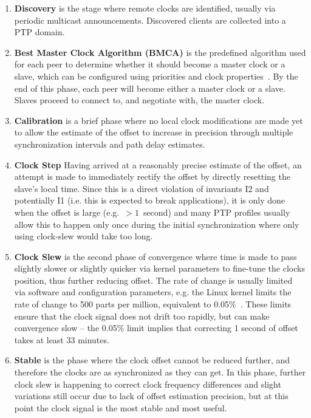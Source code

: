 \begin{enumerate}[label=S\arabic*.]
    \item \textbf{Discovery} is the stage where remote clocks are identified, usually via periodic multicast announcements. Discovered clients are collected into a PTP domain.
    \item \textbf{Best Master Clock Algorithm (BMCA)} is the predefined algorithm used for each peer to determine whether it should become a master clock or a slave, which can be configured using priorities and clock properties~\cite{bmca-deep-dive}. By the end of this phase, each peer will become either a master clock or a slave. Slaves proceed to connect to, and negotiate with, the master clock.
    \item \textbf{Calibration} is a brief phase where no local clock modifications are made yet to allow the estimate of the offset to increase in precision through multiple synchronization intervals and path delay estimates.
    \item \textbf{Clock Step} Having arrived at a reasonably precise estimate of the offset, an attempt is made to immediately rectify the offset by directly resetting the slave's local time. Since this is a direct violation of invariants I2 and potentially I1 (i.e. this is expected to break applications), it is only done when the offset is large (e.g.~$>1$~second) and many PTP profiles usually allow this to happen only once during the initial synchronization where only using clock-slew would take too long.
    \item \textbf{Clock Slew} is the second phase of convergence where time is made to pass slightly slower or slightly quicker via kernel parameters to fine-tune the clocks position, thus further reducing offset. The rate of change is usually limited via software and configuration parameters, e.g. the Linux kernel limits the rate of change to 500 parts per million, equivalent to 0.05\%~\cite{adjtimex}. These limits ensure that the clock signal does not drift too rapidly, but can make convergence slow -- the 0.05\% limit implies that correcting 1 second of offset takes at least 33 minutes.
    \item \textbf{Stable} is the phase where the clock offset cannot be reduced further, and therefore the clocks are as synchronized as they can get. In this phase, further clock slew is happening to correct clock frequency differences and slight variations still occur due to lack of offset estimation precision, but at this point the clock signal is the most stable and most useful.
\end{enumerate}

